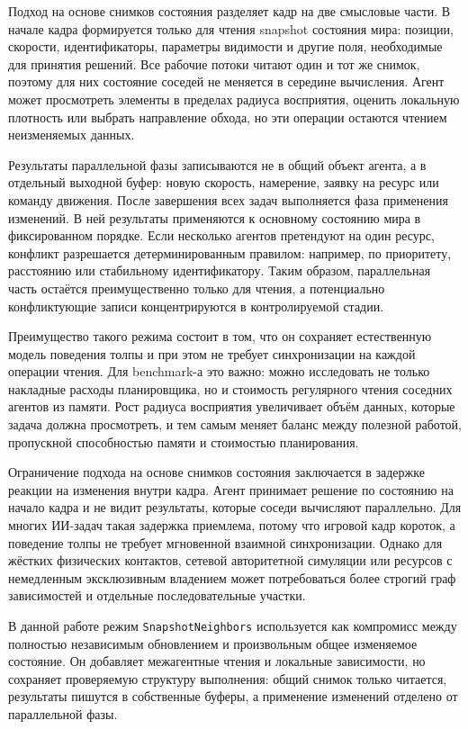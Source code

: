\documentclass[14pt,a4paper,oneside]{extreport}
\begin{document}
Подход на основе снимков состояния разделяет кадр на две смысловые части. В начале кадра формируется только для чтения snapshot состояния мира: позиции, скорости, идентификаторы, параметры видимости и другие поля, необходимые для принятия решений. Все рабочие потоки читают один и тот же снимок, поэтому для них состояние соседей не меняется в середине вычисления. Агент может просмотреть элементы в пределах радиуса восприятия, оценить локальную плотность или выбрать направление обхода, но эти операции остаются чтением неизменяемых данных.

Результаты параллельной фазы записываются не в общий объект агента, а в отдельный выходной буфер: новую скорость, намерение, заявку на ресурс или команду движения. После завершения всех задач выполняется фаза применения изменений. В ней результаты применяются к основному состоянию мира в фиксированном порядке. Если несколько агентов претендуют на один ресурс, конфликт разрешается детерминированным правилом: например, по приоритету, расстоянию или стабильному идентификатору. Таким образом, параллельная часть остаётся преимущественно только для чтения, а потенциально конфликтующие записи концентрируются в контролируемой стадии.

Преимущество такого режима состоит в том, что он сохраняет естественную модель поведения толпы и при этом не требует синхронизации на каждой операции чтения. Для benchmark-а это важно: можно исследовать не только накладные расходы планировщика, но и стоимость регулярного чтения соседних агентов из памяти. Рост радиуса восприятия увеличивает объём данных, которые задача должна просмотреть, и тем самым меняет баланс между полезной работой, пропускной способностью памяти и стоимостью планирования.

Ограничение подхода на основе снимков состояния заключается в задержке реакции на изменения внутри кадра. Агент принимает решение по состоянию на начало кадра и не видит результаты, которые соседи вычисляют параллельно. Для многих ИИ-задач такая задержка приемлема, потому что игровой кадр короток, а поведение толпы не требует мгновенной взаимной синхронизации. Однако для жёстких физических контактов, сетевой авторитетной симуляции или ресурсов с немедленным эксклюзивным владением может потребоваться более строгий граф зависимостей и отдельные последовательные участки.

В данной работе режим \texttt{SnapshotNeighbors} используется как компромисс между полностью независимым обновлением и произвольным общее изменяемое состояние. Он добавляет межагентные чтения и локальные зависимости, но сохраняет проверяемую структуру выполнения: общий снимок только читается, результаты пишутся в собственные буферы, а применение изменений отделено от параллельной фазы.
\end{document}
